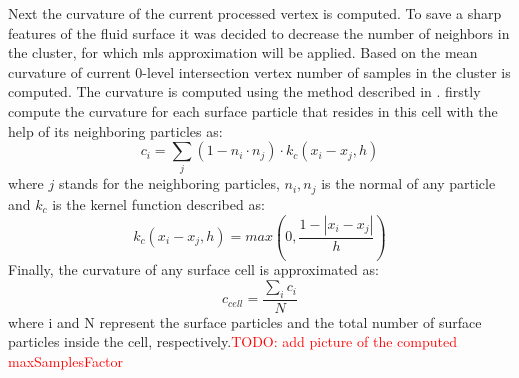 Next the curvature of the current processed vertex is computed. To save a sharp features of the fluid surface it was decided to decrease the number of neighbors in the cluster, for which mls approximation will be applied. Based on the mean curvature of current 0-level intersection vertex number of samples in the cluster is computed. The curvature is computed using the method described in \cite{CurvatureComputation}. firstly compute the curvature for each surface particle that resides in
this cell with the help of its neighboring particles as:
\begin{equation}
	c_i = \sum_j{(1 - n_i \cdot n_j)\cdot k_c(x_i-x_j, h)}
\end{equation}
where $j$ stands for the neighboring particles, $n_i, n_j$ is the normal of any particle and
$k_c$ is the kernel function described as:
\begin{equation}
	k_c(x_i-x_j, h) = max\left(0, \dfrac{1 - |x_i - x_j|}{h}\right)
\end{equation}
Finally, the curvature of any surface cell is approximated as:
\begin{equation}
	c_{cell} = \dfrac{\sum_i{c_i}}{N}
\end{equation}
where i and N represent the surface particles and the total number of surface
particles inside the cell, respectively.\textcolor{red}{TODO: add picture of the computed maxSamplesFactor}

